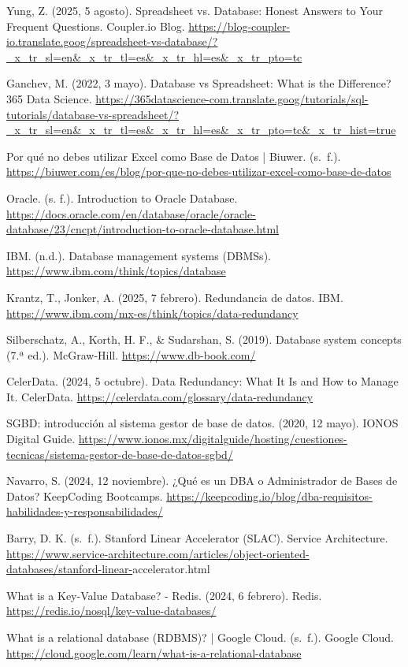 \documentclass[12pt]{report}
\begin{document}
\begin{thebibliography}{99}
    Yung, Z. (2025, 5 agosto). Spreadsheet vs. Database: Honest Answers to Your Frequent Questions. Coupler.io Blog. \url{https://blog-coupler-io.translate.goog/spreadsheet-vs-database/?_x_tr_sl=en&_x_tr_tl=es&_x_tr_hl=es&_x_tr_pto=tc}

    Ganchev, M. (2022, 3 mayo). Database vs Spreadsheet: What is the Difference? 365 Data Science. \url{https://365datascience-com.translate.goog/tutorials/sql-tutorials/database-vs-spreadsheet/?_x_tr_sl=en&_x_tr_tl=es&_x_tr_hl=es&_x_tr_pto=tc&_x_tr_hist=true}

    Por qué no debes utilizar Excel como Base de Datos | Biuwer. (s. f.). \url{https://biuwer.com/es/blog/por-que-no-debes-utilizar-excel-como-base-de-datos}

    Oracle. (s. f.). Introduction to Oracle Database. \url{https://docs.oracle.com/en/database/oracle/oracle-database/23/cncpt/introduction-to-oracle-database.html}

    IBM. (n.d.). Database management systems (DBMSs). \url{https://www.ibm.com/think/topics/database}

    Krantz, T., Jonker, A. (2025, 7 febrero). Redundancia de datos. IBM. \url{https://www.ibm.com/mx-es/think/topics/data-redundancy}

    Silberschatz, A., Korth, H. F., \& Sudarshan, S. (2019). Database system concepts (7.ª ed.). McGraw-Hill. \url{https://www.db-book.com/}

    CelerData. (2024, 5 octubre). Data Redundancy: What It Is and How to Manage It. CelerData. \url{https://celerdata.com/glossary/data-redundancy}

    SGBD: introducción al sistema gestor de base de datos. (2020, 12 mayo). IONOS Digital Guide. \url{https://www.ionos.mx/digitalguide/hosting/cuestiones-tecnicas/sistema-gestor-de-base-de-datos-sgbd/}

    Navarro, S. (2024, 12 noviembre). ¿Qué es un DBA o Administrador de Bases de Datos? KeepCoding Bootcamps. \url{https://keepcoding.io/blog/dba-requisitos-habilidades-y-responsabilidades/}

    Barry, D. K. (s. f.). Stanford Linear Accelerator (SLAC). Service Architecture. \url{https://www.service-architecture.com/articles/object-oriented-databases/stanford-linear-}accelerator.html

    What is a Key-Value Database? - Redis. (2024, 6 febrero). Redis. \url{https://redis.io/nosql/key-value-databases/}

    What is a relational database (RDBMS)? | Google Cloud. (s. f.). Google Cloud. \url{https://cloud.google.com/learn/what-is-a-relational-database}

\end{thebibliography}
\end{document}
